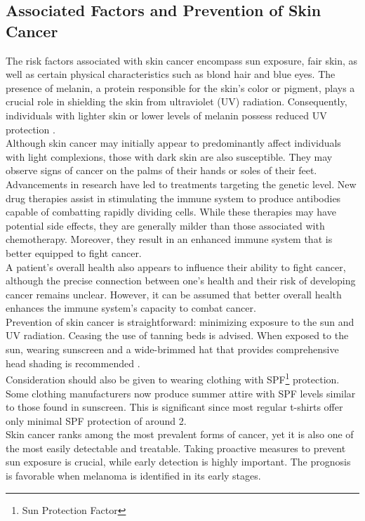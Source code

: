 \subsection{Associated Factors and Prevention of Skin Cancer}

The risk factors associated with skin cancer encompass sun exposure, fair skin,
as well as certain physical characteristics such as blond hair and blue eyes.
The presence of melanin, a protein responsible for the skin's color or pigment,
plays a crucial role in shielding the skin from ultraviolet (UV) radiation.
Consequently, individuals with lighter skin or lower levels of melanin possess
reduced UV protection \cite{OrigenAndTreatment}. \\

Although skin cancer may initially appear to predominantly affect individuals
with light complexions, those with dark skin are also susceptible. They may
observe signs of cancer on the palms of their hands or soles of their feet.
\\

Advancements in research have led to treatments targeting the genetic level.
New drug therapies assist in stimulating the immune system to produce
antibodies capable of combatting rapidly dividing cells. While these therapies
may have potential side effects, they are generally milder than those
associated with chemotherapy. Moreover, they result in an enhanced immune
system that is better equipped to fight cancer. \\

A patient's overall health also appears to influence their ability to fight
cancer, although the precise connection between one's health and their risk of
developing cancer remains unclear. However, it can be assumed that better
overall health enhances the immune system's capacity to combat cancer. \\

Prevention of skin cancer is straightforward: minimizing exposure to the sun
and UV radiation. Ceasing the use of tanning beds is advised. When exposed to
the sun, wearing sunscreen and a wide-brimmed hat that provides comprehensive
head shading is recommended \cite{OrigenAndTreatment}. \\

Consideration should also be given to wearing clothing with SPF\footnote{Sun
Protection Factor} protection. Some clothing manufacturers now produce summer
attire with SPF levels similar to those found in sunscreen. This is significant
since most regular t-shirts offer only minimal SPF protection of around 2. \\

Skin cancer ranks among the most prevalent forms of cancer, yet it is also one
of the most easily detectable and treatable. Taking proactive measures to
prevent sun exposure is crucial, while early detection is highly important. The
prognosis is favorable when melanoma is identified in its early stages.
